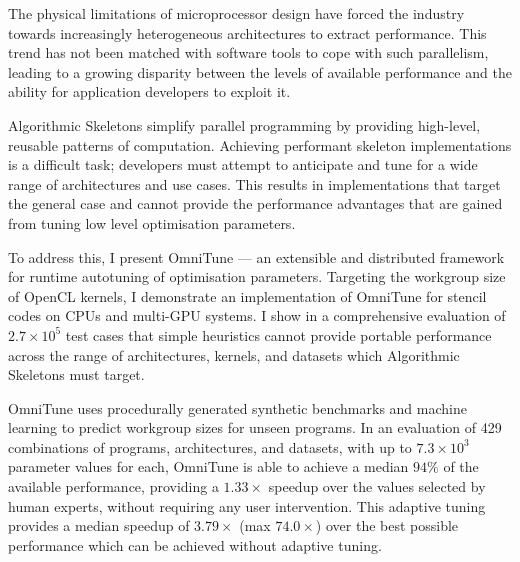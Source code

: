 The physical limitations of microprocessor design have forced the
industry towards increasingly heterogeneous architectures to extract
performance. This trend has not been matched with software tools to
cope with such parallelism, leading to a growing disparity between the
levels of available performance and the ability for application
developers to exploit it.

Algorithmic Skeletons simplify parallel programming by providing
high-level, reusable patterns of computation. Achieving performant
skeleton implementations is a difficult task; developers must attempt
to anticipate and tune for a wide range of architectures and use
cases. This results in implementations that target the general case
and cannot provide the performance advantages that are gained from
tuning low level optimisation parameters.

To address this, I present OmniTune --- an extensible and distributed
framework for runtime autotuning of optimisation parameters. Targeting
the workgroup size of OpenCL kernels, I demonstrate an implementation
of OmniTune for stencil codes on CPUs and multi-GPU systems. I show in
a comprehensive evaluation of $2.7\times 10^5$ test cases that simple
heuristics cannot provide portable performance across the range of
architectures, kernels, and datasets which Algorithmic Skeletons must
target.

OmniTune uses procedurally generated synthetic benchmarks and machine
learning to predict workgroup sizes for unseen programs. In an
evaluation of 429 combinations of programs, architectures, and
datasets, with up to $7.3\times 10^3$ parameter values for each,
OmniTune is able to achieve a median $94\%$ of the available
performance, providing a $1.33\times$ speedup over the values selected
by human experts, without requiring any user intervention. This
adaptive tuning provides a median speedup of $3.79\times$ (max
$74.0\times$) over the best possible performance which can be achieved
without adaptive tuning.
